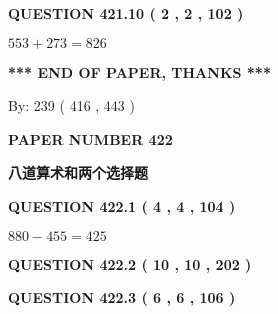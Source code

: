 \documentclass{ctexart}
\begin{document}
 
  
\vspace{0.2in}
  
{\textbf{\Large{QUESTION
421.10 
 ( 2 , 2 , 102 )
}}}
  
  
 
 

$ %
553 +  %
273=   %
826$
 
 
   
   
 \vspace{0.2in}
 
   
   
   
   
\vspace{1.0in} 
{\textbf{\large{ *** END OF PAPER, THANKS *** }}} 
   
   
\hspace{1.0in} By: 
 239 ( 416 ,  443 )
   
   
   
   
\newpage 
\setcounter{page}{ 
   422001 } 
   
   
   
   
 {\textbf{ \Large{ PAPER NUMBER  422  }}}
   
   
\vspace{0.2in}
   
   
   
   
   
   
 \vspace{0.2in}
{\LARGE {\textbf{ 八道算术和两个选择题}}}
   
   
  
\vspace{0.2in}
  
{\textbf{\Large{QUESTION
422.1 
 ( 4 , 4 , 104 )
}}}
  
  
 
 

$ %
880 -  %
455=   %
425$
 
 
  
\vspace{0.2in}
  
{\textbf{\Large{QUESTION
422.2 
 ( 10 , 10 , 202 )
}}}
  
  
  
\vspace{0.2in}
  
{\textbf{\Large{QUESTION
422.3 
 ( 6 , 6 , 106 )
}}}
  
  
 
\end{document}
